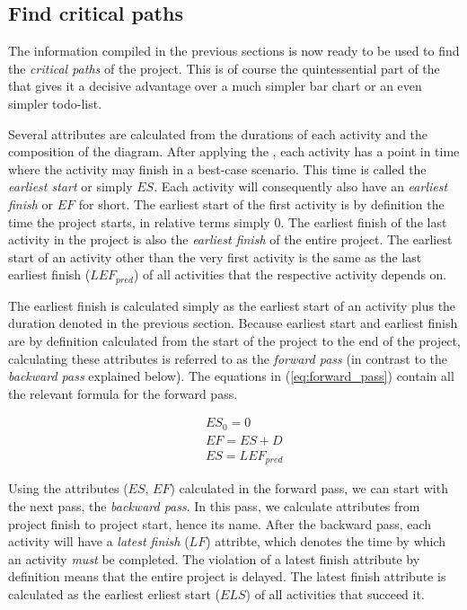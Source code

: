 \subsection{Find critical paths}\label{sec:Find_criticial_paths}
The information compiled in the previous sections is now ready to be used to find the \emph{critical
paths} of the project. This is of course the quintessential part of the \cpm{} that gives it a
decisive advantage over a much simpler bar chart or an even simpler todo-list.

Several attributes are calculated from the durations of each activity and the composition of the
diagram. After applying the \cpm{}, each activity has a point in time where the activity may finish
in a best-case scenario. This time is called the \emph{earliest start} or simply $ES$. Each activity
will consequently also have an \emph{earliest finish} or $EF$ for short. The earliest start of the
first activity is by definition the time the project starts, in relative terms simply 0. The
earliest finish of the last activity in the project is also the \emph{earliest finish} of the entire
project. The earliest start of an activity other than the very first activity is the same as the
last earliest finish ($LEF_{pred}$) of all activities that the respective activity depends on. 

The earliest
finish is calculated simply as the earliest start of an activity plus the duration denoted in the
previous section. Because earliest start and earliest finish are by definition calculated from the
start of the project to the end of the project, calculating these attributes is referred to as the
\emph{forward pass} (in contrast to the \emph{backward pass} explained below). The equations in
(\ref{eq:forward_pass}) contain all the relevant formula for the forward pass.

\begin{eqnarray}
&& ES_0=0 \nonumber\\
&& EF=ES+D \nonumber\\
&& ES=LEF_{pred}
\label{eq:forward_pass}
\end{eqnarray}

Using the attributes ($ES$, $EF$) calculated in the forward pass, we can start with the next pass,
the \emph{backward pass}. In this pass, we calculate attributes from project finish to project
start, hence its name. After the backward pass, each activity will have a \emph{latest finish} 
($LF$) attribte, which denotes the time by which an activity \emph{must} be completed. The violation
of a latest finish attribute by definition means that the entire project is delayed. The latest
finish attribute is calculated as the earliest erliest start ($ELS$) of all activities that succeed
it. 

